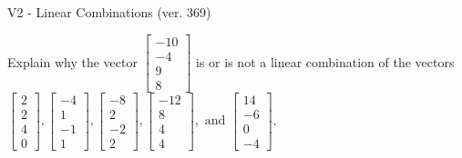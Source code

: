 \begin{exercise}
  \begin{exerciseTitle}V2 - Linear Combinations (ver. 369)\end{exerciseTitle}
  \begin{exerciseStatement}
    Explain why the vector \(\left[\begin{array}{c}
-10 \\
-4 \\
9 \\
8
\end{array}\right]\)  is or is not a linear 
	combination of the vectors \(\left[\begin{array}{c}
2 \\
2 \\
4 \\
0
\end{array}\right] , \left[\begin{array}{c}
-4 \\
1 \\
-1 \\
1
\end{array}\right] , \left[\begin{array}{c}
-8 \\
2 \\
-2 \\
2
\end{array}\right] , \left[\begin{array}{c}
-12 \\
8 \\
4 \\
4
\end{array}\right] , \text{ and } \left[\begin{array}{c}
14 \\
-6 \\
0 \\
-4
\end{array}\right]\).
	



\end{exerciseStatement}
\end{exercise}
